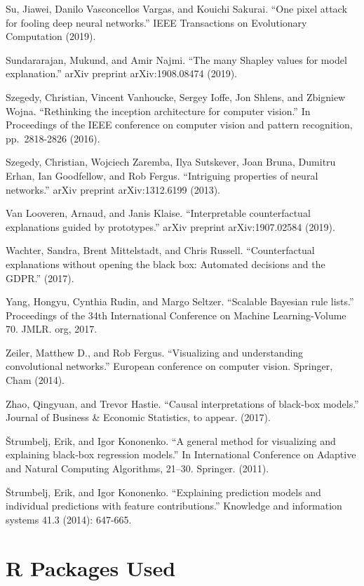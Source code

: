 \documentclass[
  11pt,
]{scrbook}
\begin{document}
Su, Jiawei, Danilo Vasconcellos Vargas, and Kouichi Sakurai. ``One pixel attack for fooling deep neural networks.'' IEEE Transactions on Evolutionary Computation (2019).

Sundararajan, Mukund, and Amir Najmi. ``The many Shapley values for model explanation.'' arXiv preprint arXiv:1908.08474 (2019).

Szegedy, Christian, Vincent Vanhoucke, Sergey Ioffe, Jon Shlens, and Zbigniew Wojna. ``Rethinking the inception architecture for computer vision.'' In Proceedings of the IEEE conference on computer vision and pattern recognition, pp.~2818-2826 (2016).

Szegedy, Christian, Wojciech Zaremba, Ilya Sutskever, Joan Bruna, Dumitru Erhan, Ian Goodfellow, and Rob Fergus. ``Intriguing properties of neural networks.'' arXiv preprint arXiv:1312.6199 (2013).

Van Looveren, Arnaud, and Janis Klaise. ``Interpretable counterfactual explanations guided by prototypes.'' arXiv preprint arXiv:1907.02584 (2019).

Wachter, Sandra, Brent Mittelstadt, and Chris Russell. ``Counterfactual explanations without opening the black box: Automated decisions and the GDPR.'' (2017).

Yang, Hongyu, Cynthia Rudin, and Margo Seltzer. ``Scalable Bayesian rule lists.'' Proceedings of the 34th International Conference on Machine Learning-Volume 70. JMLR. org, 2017.

Zeiler, Matthew D., and Rob Fergus. ``Visualizing and understanding convolutional networks.'' European conference on computer vision. Springer, Cham (2014).

Zhao, Qingyuan, and Trevor Hastie. ``Causal interpretations of black-box models.'' Journal of Business \& Economic Statistics, to appear. (2017).

Štrumbelj, Erik, and Igor Kononenko. ``A general method for visualizing and explaining black-box regression models.'' In International Conference on Adaptive and Natural Computing Algorithms, 21--30. Springer. (2011).

Štrumbelj, Erik, and Igor Kononenko. ``Explaining prediction models and individual predictions with feature contributions.'' Knowledge and information systems 41.3 (2014): 647-665.

\hypertarget{r-packages-used}{%
\section*{R Packages Used}\label{r-packages-used}}
\end{document}
